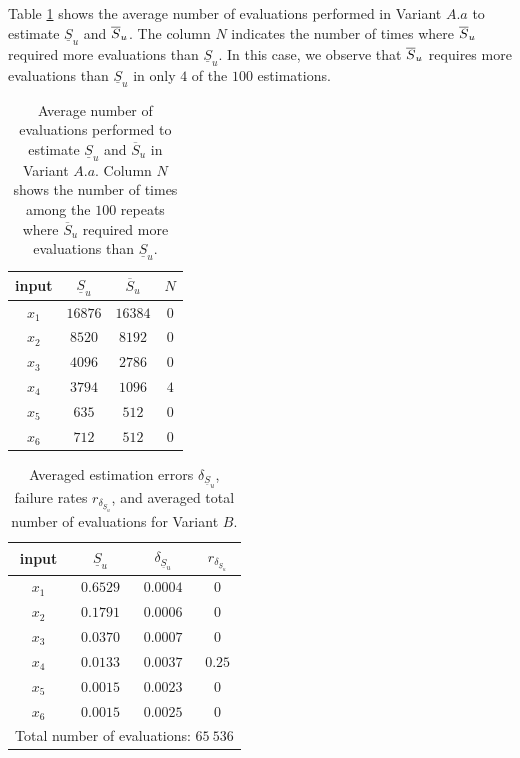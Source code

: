 {\color{purple} Table \ref{comparison.bratley} shows the average number of evaluations performed in Variant $A.a$ to estimate $\underline{S}_u$ and $\ov{$S$}_u$. The column $N$ indicates the number of times where $\ov{$S$}_u$ required more evaluations than $\underline{S}_u$. In this case, we observe that $\ov{$S$}_u$ requires more evaluations than $\underline{S}_u$ in only $4$ of the $100$ estimations.
\begin{table}[t]
\caption{Average number of evaluations performed to estimate $\underline{S}_u$ and $\overline{S}_u$ in Variant $A.a$. Column $N$ shows the number of times among the $100$ repeats where $\overline{S}_u$ required more evaluations than $\underline{S}_u$.}
\centering
\begin{tabular}{cccc}
\hline
 input & $\underline{S}_u$ & $\overline{S}_u$ & $N$ \\ \hline
 $x_1$ & $16876$ & $16384$ & $0$ \\  \hline
 $x_2$ & $8520$ & $8192$ & $0$ \\  \hline
 $x_3$ & $4096$ & $2786$ & $0$ \\  \hline
 $x_4$ & $3794$ & $1096$ & $4$ \\  \hline
 $x_5$ & $635$ & $512$ & $0$ \\  \hline
 $x_6$ & $712$ & $512$ & $0$ \\ 
\hline 
\end{tabular}
\label{comparison.bratley}
\end{table}
\begin{table}[t]
\caption{Averaged estimation errors $\delta_{\underline{S}_u}$, failure rates $r_{\delta_{\underline{S}_u}}$, and averaged total number of evaluations for Variant $B$.}
\centering
\begin{tabular}{cccc}
\hline
 input & $\underline{S}_u$ & $\delta_{\underline{S}_u}$ & $r_{\delta_{\underline{S}_u}}$ \\ \hline
 $x_1$ & $0.6529$ &  $0.0004$ & $0$ \\ \hline
 $x_2$ & $0.1791$ &  $0.0006$ & $0$ \\ \hline
 $x_3$ & $0.0370$ &  $0.0007$ & $0$ \\ \hline
 $x_4$ & $0.0133$ &  $0.0037$ & $0.25$    \\ \hline
 $x_5$ & $0.0015$ & $0.0023$ & $0$  \\ \hline
 $x_6$ & $0.0015$ & $0.0025$ & $0$  \\ \hline \hline
\multicolumn{4}{l}{Total number of evaluations: $65 \ 536$}\\ \hline 
\end{tabular}
\label{res.bratley.B}
\end{table}}

